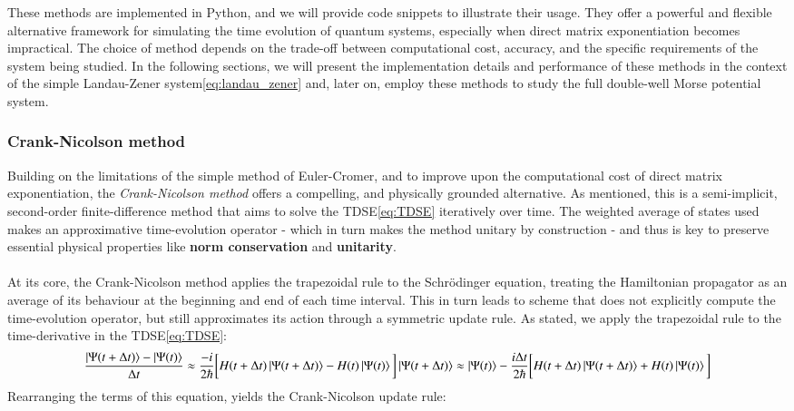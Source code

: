 \documentclass{subfiles}
\begin{document}
These methods are implemented in Python, and we will provide code snippets to illustrate their usage. They offer a powerful and flexible alternative framework for simulating the time evolution of quantum systems, especially when direct matrix exponentiation becomes impractical. The choice of method depends on the trade-off between computational cost, accuracy, and the specific requirements of the system being studied. In the following sections, we will present the implementation details and performance of these methods in the context of the simple Landau-Zener system\eqref{eq:landau_zener} and, later on, employ these methods to study the full double-well Morse potential system.

\subsubsection{Crank-Nicolson method} 
Building on the limitations of the simple method of Euler-Cromer, and to improve upon the computational cost of direct matrix exponentiation, the \emph{Crank-Nicolson method} offers a compelling, and physically grounded alternative. As mentioned, this is a semi-implicit, second-order finite-difference method that aims to solve the TDSE\eqref{eq:TDSE} iteratively over time. The weighted average of states used makes an approximative time-evolution operator - which in turn makes the method unitary by construction - and thus is key to preserve essential physical properties like \textbf{norm conservation} and \textbf{unitarity}. \\\\
At its core, the Crank-Nicolson method applies the trapezoidal rule to the Schrödinger equation, treating the Hamiltonian propagator as an average of its behaviour at the beginning and end of each time interval. This in turn leads to scheme that does not explicitly compute the time-evolution operator, but still approximates its action through a symmetric update rule. As stated, we apply the trapezoidal rule to the time-derivative in the TDSE\eqref{eq:TDSE}:
\begin{align*}
    \frac{\ket{\Psi(t + \Delta t)} - \ket{\Psi(t)}}{\Delta t} \approx \frac{-i}{2\hbar}\bigg[H(t + \Delta t)\ket{\Psi(t + \Delta t)} - H(t)\ket{\Psi(t)}\bigg]
    \ket{\Psi(t + \Delta t)} \approx \ket{\Psi(t)} - \frac{i\Delta t}{2\hbar}\bigg[H(t + \Delta t)\ket{\Psi(t + \Delta t)} + H(t)\ket{\Psi(t)}\bigg]
\end{align*}
Rearranging the terms of this equation, yields the Crank-Nicolson update rule:
\end{document}
